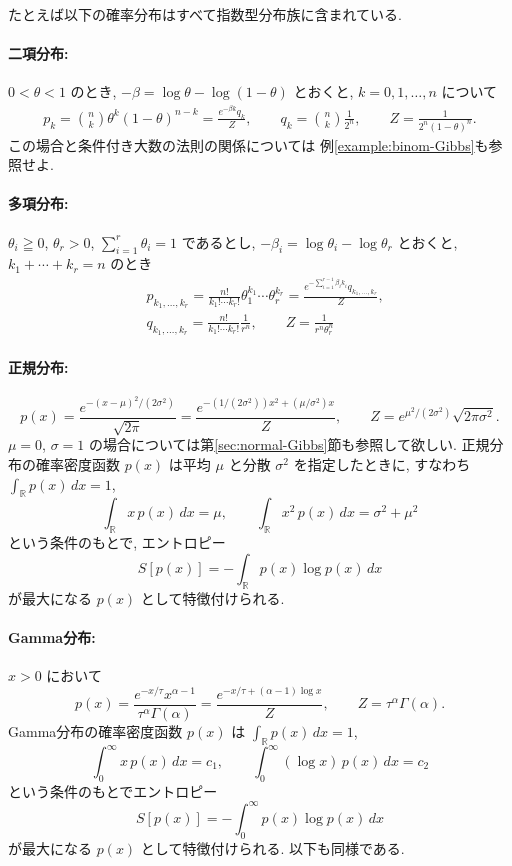 \documentclass[12pt,twoside]{jarticle}
\newcommand\R{{\mathbb R}} %
\theoremstyle{definition} %
\theoremstyle{definition} %
\theoremstyle{definition} %
\numberwithin{theorem}{section}
\numberwithin{equation}{section}
\numberwithin{figure}{section}
\numberwithin{table}{section}
\newcommand\secref[1]{第\ref{#1}節}
\newcommand\exampleref[1]{例\ref{#1}}
\begin{document}
たとえば以下の確率分布はすべて指数型分布族に含まれている.

\paragraph{二項分布:} $0<\theta<1$ のとき,
$-\beta=\log\theta-\log(1-\theta)$ とおくと, $k=0,1,\ldots,n$ について
\begin{align*}
p_k 
= \binom{n}{k} \theta^k(1-\theta)^{n-k}
=\frac{e^{-\beta k}q_k}{Z},
\qquad
q_k = \binom{n}{k}\frac{1}{2^n}, 
\qquad
Z = \frac{1}{2^n(1-\theta)^n}.
\end{align*}
この場合と条件付き大数の法則の関係については
\exampleref{example:binom-Gibbs}も参照せよ.

\paragraph{多項分布:} $\theta_i\geqq 0$, $\theta_r>0$, $\sum_{i=1}^r\theta_i=1$ であるとし, 
$-\beta_i=\log\theta_i-\log\theta_r$ とおくと, \\
$k_1+\cdots+k_r=n$ のとき
\begin{align*}
&
p_{k_1,\ldots,k_r}
=
\frac{n!}{k_1!\cdots k_r!}\theta_1^{k_1}\cdots \theta_r^{k_r}
=\frac{e^{-\sum_{i=1}^{r-1}\beta_i k_i}q_{k_1,\ldots,k_r}}{Z},
\\ &
q_{k_1,\ldots,k_r}
=\frac{n!}{k_1!\cdots k_r!}\frac{1}{r^n},
\qquad
Z=\frac{1}{r^n\theta_r^n}
\end{align*}

\paragraph{正規分布:}
\[
p(x) 
= \frac{e^{-(x-\mu)^2/(2\sigma^2)}}{\sqrt{2\pi}}
= \frac{e^{-(1/(2\sigma^2))x^2+(\mu/\sigma^2)x}}{Z},
\qquad Z=e^{\mu^2/(2\sigma^2)}\sqrt{2\pi\sigma^2}.
\]
$\mu=0$, $\sigma=1$ の場合については\secref{sec:normal-Gibbs}も参照して欲しい.
正規分布の確率密度函数 $p(x)$ は平均 $\mu$ と分散 $\sigma^2$ を指定したときに, 
すなわち $\int_\R p(x)\,dx=1$, 
\[
\int_\R x\,p(x)\,dx=\mu, \qquad
\int_\R x^2\,p(x)\,dx = \sigma^2+\mu^2
\]
という条件のもとで, エントロピー
\[
S[p(x)] = -\int_\R p(x)\log p(x)\,dx
\]
が最大になる $p(x)$ として特徴付けられる.

\paragraph{Gamma分布:} $x>0$ において
\[
p(x)=\frac{e^{-x/\tau}x^{\alpha-1}}{\tau^{\alpha}\Gamma(\alpha)}
=\frac{e^{-x/\tau+(\alpha-1)\log x}}{Z}, 
\qquad
Z=\tau^{\alpha}\Gamma(\alpha).
\]
Gamma分布の確率密度函数 $p(x)$ は $\int_\R p(x)\,dx=1$, 
\[
\int_0^\infty x\,p(x)\,dx=c_1, \qquad
\int_0^\infty (\log x)\, p(x)\,dx = c_2
\]
という条件のもとでエントロピー
\[
S[p(x)] = - \int_0^\infty p(x)\log p(x)\,dx
\]
が最大になる $p(x)$ として特徴付けられる. 以下も同様である.
\end{document}
